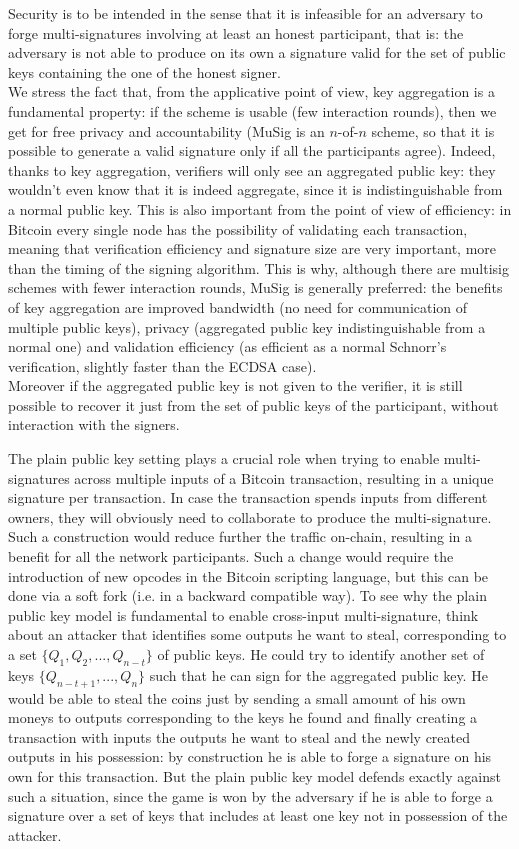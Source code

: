 Security is to be intended in the sense that it is infeasible for an adversary to forge multi-signatures involving at least an honest participant, that is: the adversary is not able to produce on its own a signature valid for the set of public keys containing the one of the honest signer.
\\
We stress the fact that, from the applicative point of view, key aggregation is a fundamental property: if the scheme is usable (few interaction rounds), then we get for free privacy and accountability (MuSig is an $n$-of-$n$ scheme, so that it is possible to generate a valid signature only if all the participants agree). Indeed, thanks to key aggregation, verifiers will only see an aggregated public key: they wouldn't even know that it is indeed aggregate, since it is indistinguishable from a normal public key. This is also important from the point of view of efficiency: in Bitcoin every single node has the possibility of validating each transaction, meaning that verification efficiency and signature size are very important, more than the timing of the signing algorithm. This is why, although there are multisig schemes with fewer interaction rounds, MuSig is generally preferred: the benefits of key aggregation are improved bandwidth (no need for communication of multiple public keys), privacy (aggregated public key indistinguishable from a normal one) and validation efficiency (as efficient as a normal Schnorr's verification, slightly faster than the ECDSA case).
\\
Moreover if the aggregated public key is not given to the verifier, it is still possible to recover it just from the set of public keys of the participant, without interaction with the signers.

\bigskip
\noindent
The plain public key setting plays a crucial role when trying to enable multi-signatures across multiple inputs of a Bitcoin transaction, resulting in a unique signature per transaction.  In case the transaction spends inputs from different owners, they will obviously need to collaborate to produce the multi-signature. Such a construction would reduce further the traffic on-chain, resulting in a benefit for all the network participants. Such a change would require the introduction of new opcodes in the Bitcoin scripting language, but this can be done via a soft fork (i.e. in a backward compatible way). To see why the plain public key model is fundamental to enable cross-input multi-signature, think about an attacker that identifies some outputs he want to steal, corresponding to a set $\{Q_1, Q_2, ..., Q_{n - t}\}$ of public keys. He could try to identify another set of keys $\{Q_{n - t + 1}, ..., Q_n\}$ such that he can sign for the aggregated public key. He would be able to steal the coins just by sending a small amount of his own moneys to outputs corresponding to the keys he found and finally creating a transaction with inputs the outputs he want to steal and the newly created outputs in his possession: by construction he is able to forge a signature on his own for this transaction. But the plain public key model defends exactly against such a situation, since the game is won by the adversary if he is able to forge a signature over a set of keys that includes at least one key not in possession of the attacker. 

